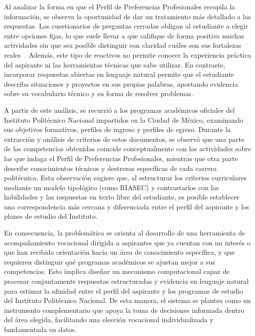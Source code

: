 Al analizar la forma en que el Perfil de Preferencias Profesionales recopila la información, se observa la oportunidad de dar un tratamiento más detallado a las respuestas. Los cuestionarios de preguntas cerradas obligan al estudiante a elegir entre opciones fijas, lo que suele llevar a que califique de forma positiva muchas actividades sin que sea posible distinguir con claridad cuáles son sus fortalezas reales~\cite{Vargas2026}. Además, este tipo de reactivos no permite conocer la experiencia práctica del aspirante ni las herramientas técnicas que sabe utilizar. En contraste, incorporar respuestas abiertas en lenguaje natural permite que el estudiante describa situaciones y proyectos en sus propias palabras, aportando evidencia sobre su vocabulario técnico y su forma de resolver problemas.

A partir de este análisis, se recurrió a los programas académicos oficiales del Instituto Politécnico Nacional impartidos en la Ciudad de México, examinando sus objetivos formativos, perfiles de ingreso y perfiles de egreso. Durante la extracción y análisis de criterios de estos documentos, se observó que una parte de las competencias obtenidas coincide conceptualmente con las actividades sobre las que indaga el Perfil de Preferencias Profesionales, mientras que otra parte describe conocimientos técnicos y destrezas específicas de cada carrera politécnica. Esta observación sugiere que, al estructurar los criterios curriculares mediante un modelo tipológico (como RIASEC) y contrastarlos con las habilidades y las respuestas en texto libre del estudiante, es posible establecer una correspondencia más cercana y diferenciada entre el perfil del aspirante y los planes de estudio del Instituto.

En consecuencia, la problemática se orienta al desarrollo de una herramienta de acompañamiento vocacional dirigida a aspirantes que ya cuentan con un interés o que han recibido orientación hacia un área de conocimiento específica, y que requieren distinguir qué programas académicos se ajustan mejor a sus competencias. Esto implica diseñar un mecanismo computacional capaz de procesar conjuntamente respuestas estructuradas y evidencia en lenguaje natural para estimar la afinidad entre el perfil del aspirante y los programas de estudio del Instituto Politécnico Nacional. De esta manera, el sistema se plantea como un instrumento complementario que apoya la toma de decisiones informada dentro del área elegida, facilitando una elección vocacional individualizada y fundamentada en datos.

